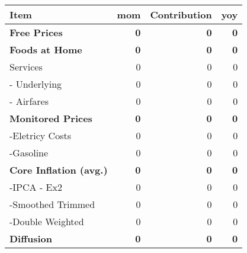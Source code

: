 \documentclass[11pt]{article}
\date{\today}
\title{}
\begin{document}
\begin{center}
\begin{tabular}{lrrr}
\textbf{Item} & \textbf{mom} & \textbf{Contribution} & \textbf{yoy}\\
\hline
\textbf{Free Prices} & \textbf{0} & \textbf{0} & \textbf{0}\\
\textbf{Foods at Home} & \textbf{0} & \textbf{0} & \textbf{0}\\
Services & 0 & 0 & 0\\
- Underlying & 0 & 0 & 0\\
- Airfares & 0 & 0 & 0\\
\textbf{Monitored Prices} & \textbf{0} & \textbf{0} & \textbf{0}\\
-Eletricy Costs & 0 & 0 & 0\\
-Gasoline & 0 & 0 & 0\\
\textbf{Core Inflation (avg.)} & \textbf{0} & \textbf{0} & \textbf{0}\\
-IPCA - Ex2 & 0 & 0 & 0\\
-Smoothed Trimmed & 0 & 0 & 0\\
-Double Weighted & 0 & 0 & 0\\
\textbf{Diffusion} & \textbf{0} & \textbf{0} & \textbf{0}\\
\end{tabular}
\end{center}
\end{document}
